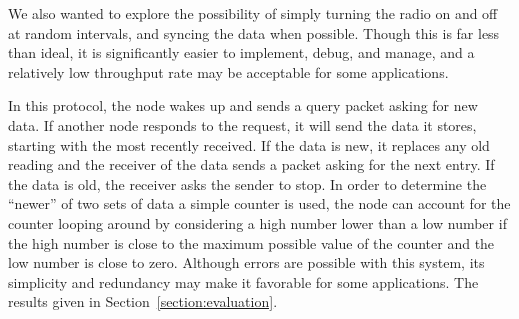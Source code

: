 We also wanted to explore the possibility of simply turning the radio on and off at random intervals, and syncing the
data when possible.  Though this is far less than ideal, it is significantly easier to implement, debug, and manage, and
a relatively low throughput rate may be acceptable for some applications.

In this protocol, the node wakes up and sends
a query packet asking for new data.  If another node responds to the request, it will send the data it stores, starting
with the most recently received.  If the data is new, it replaces any old reading and the receiver of the data sends a
packet asking for the next entry.  If the data is old, the receiver asks the sender to stop.  In order to determine the
``newer'' of two sets of data a simple counter is used, the node can account for the counter looping around by considering
a high number lower than a low number if the high number is close to the maximum possible value of the counter and the
low number is close to zero.  Although errors are possible with this system, its simplicity and redundancy may make it
favorable for some applications.  The results given in Section~\ref{section:evaluation}.
